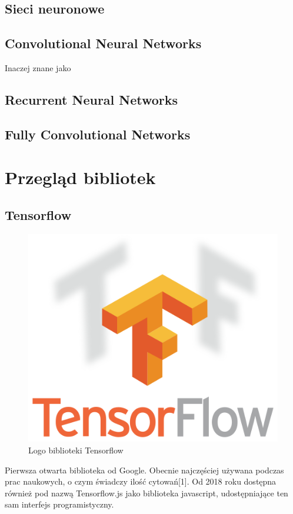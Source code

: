 \documentclass[a4paper,twoside,titlepage,openright]{book}
\begin{document}
\subsection{Sieci neuronowe}
\subsection{Convolutional Neural Networks}
Inaczej znane jako
\subsection{Recurrent Neural Networks}
\subsection{Fully Convolutional Networks}

\section{Przegląd bibliotek}

\subsection{Tensorflow}
\begin{figure}[h]
	\centering
			\includegraphics[resolution=120]{Tensorflow.png}
		\caption{Logo biblioteki Tensorflow}
\end{figure}
Pierwsza otwarta biblioteka od Google. Obecnie najczęściej używana podczas prac naukowych, o czym świadczy ilość cytowań[1]. Od 2018 roku dostępna również pod nazwą Tensorflow.js jako biblioteka javascript, udostępniające ten sam interfejs programistyczny.
\end{document}
